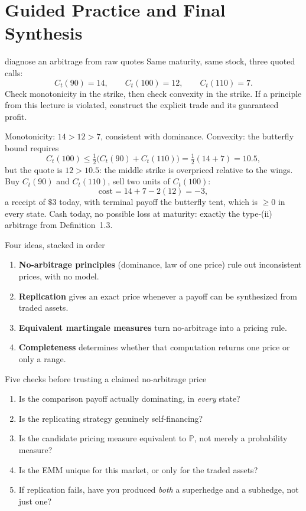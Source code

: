 \documentclass[10pt]{article}
\newcommand{\Pp}{\mathbb P}
\newcommand{\1}{\mathbf 1}
\theoremstyle{definition}
\begin{document}
\section{Guided Practice and Final Synthesis}

\begin{studentexercise}{diagnose an arbitrage from raw quotes}
Same maturity, same stock, three quoted calls:
\[
C_t(90)=14,\qquad C_t(100)=12,\qquad C_t(110)=7.
\]
Check monotonicity in the strike, then check convexity in the strike. If a
principle from this lecture is violated, construct the explicit trade and
its guaranteed profit.
\end{studentexercise}
\begin{shortsolution}
Monotonicity: \(14>12>7\), consistent with dominance. Convexity: the
butterfly bound requires
\[
C_t(100)\leq\tfrac12\bigl(C_t(90)+C_t(110)\bigr)=\tfrac12(14+7)=10.5,
\]
but the quote is \(12>10.5\): the middle strike is overpriced relative to
the wings. Buy \(C_t(90)\) and \(C_t(110)\), sell two units of \(C_t(100)\):
\[
\text{cost}=14+7-2(12)=-3,
\]
a receipt of \(\$3\) today, with terminal payoff the butterfly tent, which is
\(\geq0\) in every state. Cash today, no possible loss at maturity: exactly
the type-(ii) arbitrage from Definition~1.3.
\end{shortsolution}

\begin{keyidea}{Four ideas, stacked in order}
\begin{enumerate}
  \item \textbf{No-arbitrage principles} (dominance, law of one price) rule
        out inconsistent prices, with no model.
  \item \textbf{Replication} gives an exact price whenever a payoff can be
        synthesized from traded assets.
  \item \textbf{Equivalent martingale measures} turn no-arbitrage into a
        pricing rule.
  \item \textbf{Completeness} determines whether that computation returns one
        price or only a range.
\end{enumerate}
\end{keyidea}

\begin{keyidea}{Five checks before trusting a claimed no-arbitrage price}
\begin{enumerate}
  \item Is the comparison payoff actually dominating, in \emph{every} state?
  \item Is the replicating strategy genuinely self-financing?
  \item Is the candidate pricing measure equivalent to \(\Pp\), not merely a
        probability measure?
  \item Is the EMM unique for this market, or only for the traded assets?
  \item If replication fails, have you produced \emph{both} a superhedge and
        a subhedge, not just one?
\end{enumerate}
\end{keyidea}
\end{document}
